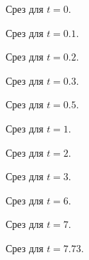 \begin{figure}[H]
\caption{Срез для $t=0$.}
\end{figure}

\begin{figure}[H]
\caption{Срез для $t=0.1$.}
\end{figure}

\begin{figure}[H]
\caption{Срез для $t=0.2$.}
\end{figure}

\begin{figure}[H]
\caption{Срез для $t=0.3$.}
\end{figure}

\begin{figure}[H]
\caption{Срез для $t=0.5$.}
\end{figure}

\begin{figure}[H]
\caption{Срез для $t=1$.}
\end{figure}

\begin{figure}[H]
\caption{Срез для $t=2$.}
\end{figure}

\begin{figure}[H]
\caption{Срез для $t=3$.}
\end{figure}

\begin{figure}[H]
\caption{Срез для $t=6$.}
\end{figure}

\begin{figure}[H]
\caption{Срез для $t=7$.}
\end{figure}

\begin{figure}[H]
\caption{Срез для $t=7.73$.}
\end{figure}
